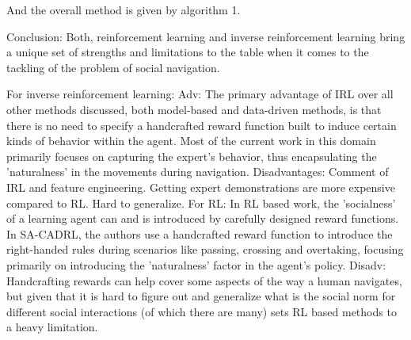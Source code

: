 And the overall method is given by algorithm 1.


Conclusion:
Both, reinforcement learning and inverse reinforcement learning bring a unique set of strengths and limitations to the table when it comes to the tackling of the problem of social navigation. 

For inverse reinforcement learning:
Adv:
The primary advantage of IRL over all other methods discussed, both model-based and data-driven methods, is that there is no need to specify a handcrafted reward function built to induce certain kinds of behavior within the agent. Most of the current work in this domain primarily focuses on capturing the expert's behavior, thus encapsulating the 'naturalness' in the movements during navigation.
Disadvantages:
Comment of IRL and feature engineering. 
Getting expert demonstrations are more expensive compared to RL.
Hard to generalize. 
For RL:
In RL based work, the 'socialness' of a learning agent can and is introduced by carefully designed reward functions. In SA-CADRL, the authors use a handcrafted reward function to introduce the right-handed rules during scenarios like passing, crossing and overtaking, focusing primarily on introducing the 'naturalness' factor in the agent's policy.
Disadv:
Handcrafting rewards can help cover some aspects of the way a human navigates, but given that it is hard to figure out and generalize what is the social norm for different social interactions (of which there are many) sets RL based methods to a heavy limitation.